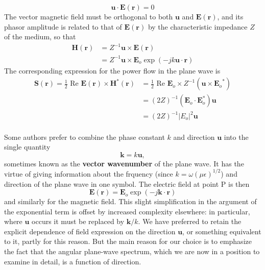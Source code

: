 \begin{itemize}
	\begin{equation}
	\mathbf{u}\cdot\mathbf{E}(\mathbf{r})=0
	\end{equation}
	The vector magnetic field must be orthogonal to both $\mathbf{u}$ and $\mathbf{E}(\mathbf{r})$, and its phasor amplitude is related to that of $\mathbf{E}(\mathbf{r})$ by the characteristic impedance $Z$ of the medium, so that
	\begin{equation}
	\begin{aligned}
	\mathbf{H}(\mathbf{r})&=Z^{-1}\mathbf{u}\times\mathbf{E}(\mathbf{r})\\
	&=Z^{-1}\mathbf{u}\times\mathbf{E}_o\exp(-jk\mathbf{u}\cdot\mathbf{r})
	\end{aligned}
	\end{equation}
	The corresponding expression for the power flow in the plane wave is
	\begin{equation}
	\begin{aligned}
	\mathbf{S}(\mathbf{r})=\frac{1}{2}\text{ Re }\mathbf{E}(\mathbf{r})\times \mathbf{H}^{*}(\mathbf{r})&=\frac{1}{2}\text{ Re }\mathbf{E}_o\times Z^{-1}(\mathbf{u}\times {\mathbf{E}_{o}}^*)\\
	&=(2Z)^{-1}(\mathbf{E}_o\cdot{\mathbf{E}_o^*})\mathbf{u}\\
	&=(2Z)^{-1}|E_o|^2\mathbf{u}
	\end{aligned}
	\end{equation}\\
	Some authors prefer to combine the phase constant $k$ and direction $\mathbf{u}$ into the single quantity
	\begin{equation}
	\mathbf{k}=k\mathbf{u},
	\end{equation}
	sometimes known as the \textbf{vector wavenumber} of the plane wave. It has the virtue of giving information about the frquency (since $k=\omega(\mu\epsilon)^{1/2}$) and direction of the plane wave in one symbol. The electric field at point P is then
	\begin{equation}
	\mathbf{E}(\mathbf{r})=\mathbf{E}_o\exp(-j\mathbf{k}\cdot\mathbf{r})
	\end{equation}
	and similarly for the magnetic field. This slight simplification in the argument of the exponential term is offset by increased complexity elsewhere: in particular, where $\mathbf{u}$ occurs it must be replaced by $\mathbf{k}/k$. We have preferred to retain the explicit dependence of field expression on the direction $\mathbf{u}$, or something equivalent to it, partly for this reason. But the main reason for our choice is to emphasize the fact that the angular plane-wave spectrum, which we are now in a position to examine in detail, is a function of direction.
\end{itemize}

